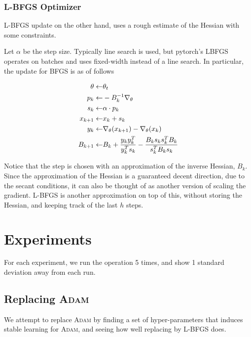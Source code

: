 \documentclass[11pt]{article}
\begin{document}
\subsubsection{\textsc{L-BFGS} Optimizer}
\textsc{L-BFGS} update on the other hand, uses a rough estimate of the Hessian with some constraints.

Let $\alpha$ be the step size. Typically line search is used, but pytorch's LBFGS operates on batches and uses fixed-width instead of a line search.
In particular, the update for \textsc{BFGS} is as of follows

\begin{align*}
  \theta \leftarrow & \theta_{t} \\
  p_k \leftarrow & -B_k^{-1}\nabla_\theta \\
  s_k \leftarrow & \alpha \cdot p_k \\
  x_{k+1} \leftarrow & x_k + s_k \\
  y_k \leftarrow & \nabla_\theta(x_{k+1}) - \nabla_\theta(x_{k}) \\
  B_{k+1} \leftarrow & B_k + \frac{y_{k}y_k^T}{y_k^{T}s_k} - \frac{B_{k}s_{k}s_{k}^{T}B_k}{s_{k}^{T}B_{k}s_k} \\
\end{align*}

Notice that the step is chosen with an approximation of the inverse Hessian, $B_k$.
Since the approximation of the Hessian is a guaranteed decent direction, due to the secant conditions, it can also be thought of as another version of scaling the gradient.
\textsc{L-BFGS} is another approximation on top of this, without storing the Hessian, and keeping track of the last $h$ steps.

\section{Experiments}
For each experiment, we run the operation 5 times, and show 1 standard deviation away from each run.
\subsection{Replacing \textsc{Adam}}
We attempt to replace \textsc{Adam} by finding a set of hyper-parameters that induces stable learning for \textsc{Adam}, and seeing how well replacing by \textsc{L-BFGS} does.

%
\end{document}
